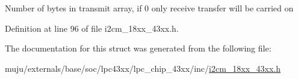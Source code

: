 Number of bytes in transmit array, if 0 only receive transfer will be carried on 

Definition at line 96 of file i2cm\+\_\+18xx\+\_\+43xx.\+h.



The documentation for this struct was generated from the following file\+:\begin{DoxyCompactItemize}
\item 
muju/externals/base/soc/lpc43xx/lpc\+\_\+chip\+\_\+43xx/inc/\hyperlink{i2cm__18xx__43xx_8h}{i2cm\+\_\+18xx\+\_\+43xx.\+h}\end{DoxyCompactItemize}
